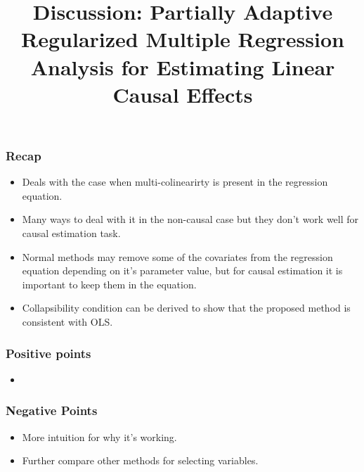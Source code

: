 \documentclass{beamer}
\begin{document}
\title{Discussion: Partially Adaptive Regularized Multiple Regression Analysis for Estimating Linear Causal Effects}

\begin{frame}
	\frametitle{Recap}
	\begin{itemize}
		\item Deals with the case when multi-colinearirty is present in the regression equation.
		\item Many ways to deal with it in the non-causal case but they don't work well for causal estimation task.
		\item Normal methods may remove some of the covariates from the regression equation depending on it's parameter value,
			but for causal estimation it is important to keep them in the equation.
		\item Collapsibility condition can be derived to show that the proposed method is consistent with OLS.
	\end{itemize}
\end{frame}

\begin{frame}
	\frametitle{Positive points}
	\begin{itemize}
		\item 
	\end{itemize}
\end{frame}

\begin{frame}
	\frametitle{Negative Points}
	\begin{itemize}
		\item More intuition for why it's working.
		\item Further compare other methods for selecting variables.
	\end{itemize}
\end{frame}

\end{document}
